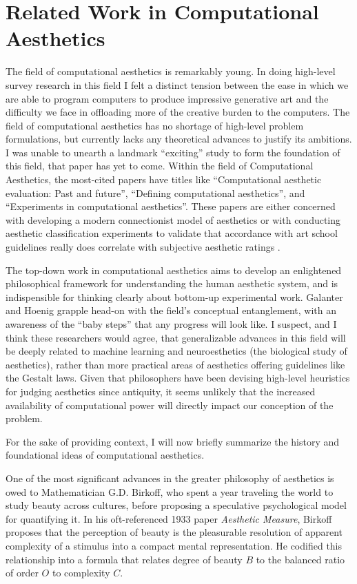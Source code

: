 \documentclass[midd]{thesis}
\begin{document}
\section{Related Work in Computational Aesthetics}

The field of computational aesthetics is remarkably young. In doing high-level survey research in this field I felt a distinct tension between the ease in which we are able to program computers to produce impressive generative art and the difficulty we face in offloading more of the creative burden to the computers. The field of computational aesthetics has no shortage of high-level problem formulations, but currently lacks any theoretical advances to justify its ambitions. I was unable to unearth a landmark ``exciting'' study to form the foundation of this field, that paper has yet to come. Within the field of Computational Aesthetics, the most-cited papers  have titles like ``Computational aesthetic evaluation: Past and future'', ``Defining computational aesthetics'', and ``Experiments in computational aesthetics''. These papers are either concerned with developing a modern connectionist model of aesthetics or with conducting aesthetic classification experiments to validate that accordance with art school guidelines really does correlate with subjective aesthetic ratings \cite{galanter2012computational, hoenig2005defining, machado2008experiments}.

The top-down work in computational aesthetics aims to develop an enlightened philosophical framework for understanding the human aesthetic system, and is indispensible for thinking clearly about bottom-up experimental work. Galanter and Hoenig grapple head-on with the field's conceptual entanglement, with an awareness of the ``baby steps'' that any progress will look like. I suspect, and I think these researchers would agree, that generalizable advances in this field will be deeply related to machine learning and neuroesthetics (the biological study of aesthetics), rather than more practical areas of aesthetics offering guidelines like the Gestalt laws. Given that philosophers have been devising high-level heuristics for judging aesthetics since antiquity, it seems unlikely that the increased availability of computational power will directly impact our conception of the problem.

For the sake of providing context, I will now briefly summarize the history and foundational ideas of computational aesthetics.

One of the most significant advances in the greater philosophy of aesthetics is owed to Mathematician G.D. Birkoff, who spent a year traveling the world to study beauty across cultures, before proposing a speculative psychological model for quantifying it. In his oft-referenced 1933 paper \emph{Aesthetic Measure}, Birkoff proposes that the perception of beauty is the pleasurable resolution of apparent complexity of a stimulus into a compact mental representation. He codified this relationship into a formula that relates degree of beauty $B$ to the balanced ratio of order $O$ to complexity $C$.
\end{document}
